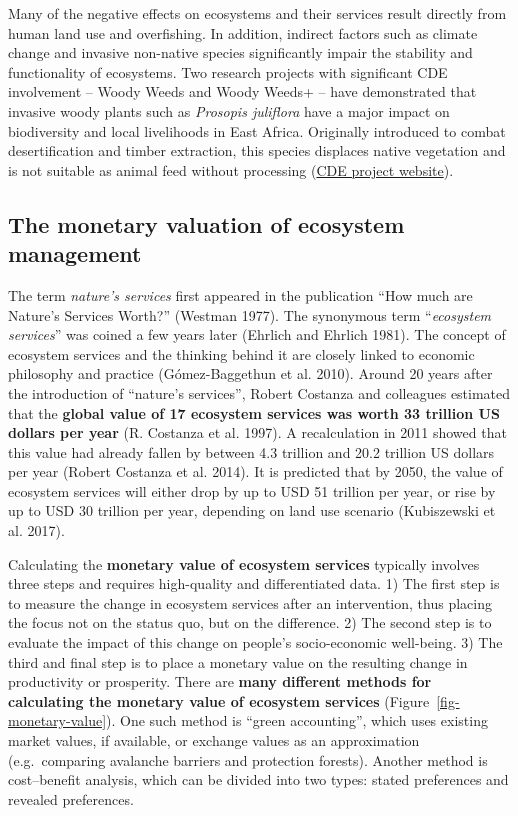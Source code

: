 \documentclass[
  a4paper,
  openany]{book}
\begin{document}
Many of the negative effects on ecosystems and their services result
directly from human land use and overfishing. In addition, indirect
factors such as climate change and invasive non-native species
significantly impair the stability and functionality of ecosystems. Two
research projects with significant CDE involvement -- Woody Weeds and
Woody Weeds+ -- have demonstrated that invasive woody plants such as
\emph{Prosopis juliflora} have a major impact on biodiversity and local
livelihoods in East Africa. Originally introduced to combat
desertification and timber extraction, this species displaces native
vegetation and is not suitable as animal feed without processing
(\href{https://www.cde.unibe.ch/research/projects/woody_invasive_alien_species_in_eastern_africa/index_eng.html}{CDE
project website}).

\subsection{The monetary valuation of ecosystem
management}\label{the-monetary-valuation-of-ecosystem-management}

The term \emph{nature's services} first appeared in the publication
``How much are Nature's Services Worth?'' (Westman 1977). The synonymous
term ``\emph{ecosystem services}'' was coined a few years later (Ehrlich
and Ehrlich 1981). The concept of ecosystem services and the thinking
behind it are closely linked to economic philosophy and practice
(Gómez-Baggethun et al. 2010). Around 20 years after the introduction of
``nature's services'', Robert Costanza and colleagues estimated that the
\textbf{global value of 17 ecosystem services was worth 33 trillion US
dollars per year} (R. Costanza et al. 1997). A recalculation in 2011
showed that this value had already fallen by between 4.3 trillion and
20.2 trillion US dollars per year (Robert Costanza et al. 2014). It is
predicted that by 2050, the value of ecosystem services will either drop
by up to USD 51 trillion per year, or rise by up to USD 30 trillion per
year, depending on land use scenario (Kubiszewski et al. 2017).

Calculating the \textbf{monetary value of ecosystem services} typically
involves three steps and requires high-quality and differentiated data.
1) The first step is to measure the change in ecosystem services after
an intervention, thus placing the focus not on the status quo, but on
the difference. 2) The second step is to evaluate the impact of this
change on people's socio-economic well-being. 3) The third and final
step is to place a monetary value on the resulting change in
productivity or prosperity. There are \textbf{many different methods for
calculating the monetary value of ecosystem services}
(Figure~\ref{fig-monetary-value}). One such method is ``green
accounting'', which uses existing market values, if available, or
exchange values as an approximation (e.g.~comparing avalanche barriers
and protection forests). Another method is cost--benefit analysis, which
can be divided into two types: stated preferences and revealed
preferences.
\end{document}
